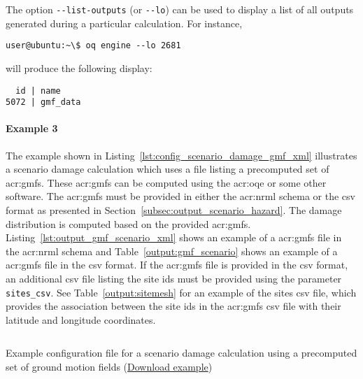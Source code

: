 The option \Verb+--list-outputs+ (or \Verb+--lo+) can be used to display a
list of all outputs generated during a particular calculation. For instance,

\begin{verbatim}
user@ubuntu:~\$ oq engine --lo 2681
\end{verbatim}

will produce the following display:

\begin{verbatim}
  id | name
5072 | gmf_data
\end{verbatim}


\paragraph{Example 3}

The example shown in Listing~\ref{lst:config_scenario_damage_gmf_xml} illustrates
a scenario damage calculation which uses a file listing a precomputed set of
\glspl{acr:gmf}. These \glspl{acr:gmf} can be computed using the
\glsdesc{acr:oqe} or some other software. The \glspl{acr:gmf} must be provided
in either the \gls{acr:nrml} schema or the csv format as presented in
Section~\ref{subsec:output_scenario_hazard}. The damage distribution is
computed based on the provided \glspl{acr:gmf}.
Listing~\ref{lst:output_gmf_scenario_xml} shows an example of a
\glspl{acr:gmf} file in the \gls{acr:nrml} schema and
Table~\ref{output:gmf_scenario} shows an example of a \glspl{acr:gmf} file in
the csv format. If the \glspl{acr:gmf} file is provided in the csv format, an
additional csv file listing the site ids must be provided using the parameter
\Verb+sites_csv+. See Table~\ref{output:sitemesh} for an example of the sites
csv file, which provides the association between the site ids in the
\glspl{acr:gmf} csv file with their latitude and longitude coordinates.

\begin{listing}[htbp]
  \inputminted[firstline=1,firstnumber=1,fontsize=\footnotesize,frame=single,linenos,bgcolor=lightgray,label=job.ini]{ini}{oqum/risk/verbatim/config_scenario_damage_gmf_xml.ini}
  \caption{Example configuration file for a scenario damage calculation using a precomputed set of ground motion fields (\href{https://raw.githubusercontent.com/gem/oq-engine/master/doc/manual/oqum/risk/verbatim/config_scenario_damage_gmf_xml.ini}{Download example})}
  \label{lst:config_scenario_damage_gmf_xml}
\end{listing}

